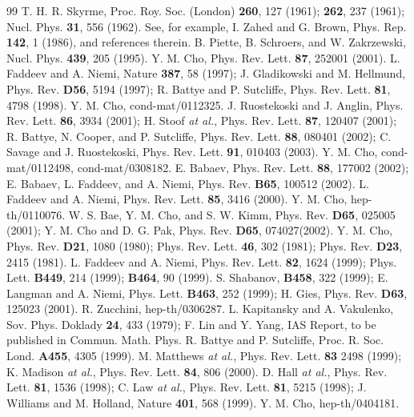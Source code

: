 \documentclass[twocolumn,showpacs,showkeys]{revtex4}
\begin{document}
\begin{thebibliography}{99}
T. H. R. Skyrme, Proc. Roy. Soc. (London) {\bf 260}, 127
(1961); {\bf 262}, 237 (1961); Nucl. Phys. {\bf 31}, 556 (1962).
 See, for example, I. Zahed and G. Brown,
Phys. Rep. {\bf 142}, 1 (1986), and references therein.
 B. Piette, B. Schroers, and W. Zakrzewski,
Nucl. Phys. {\bf 439}, 205 (1995).
 Y. M. Cho, Phys. Rev. Lett. {\bf 87}, 252001 (2001).
 L. Faddeev and A. Niemi, Nature {\bf 387}, 58 (1997);
J. Gladikowski and M. Hellmund, Phys. Rev. {\bf D56}, 5194 (1997);
R. Battye and P. Sutcliffe, Phys. Rev. Lett. {\bf 81}, 4798 (1998).
 Y. M. Cho, cond-mat/0112325.
 J. Ruostekoski and J. Anglin, Phys. Rev. Lett.
{\bf 86}, 3934 (2001); H. Stoof {\it at al.}, Phys. Rev. Lett. {\bf
87}, 120407 (2001); R. Battye, N. Cooper, and P. Sutcliffe,
Phys. Rev. Lett. {\bf 88}, 080401 (2002); C. Savage and
J. Ruostekoski, Phys. Rev. Lett. {\bf 91}, 010403 (2003).
 Y. M. Cho, cond-mat/0112498, cond-mat/0308182.
 E. Babaev, Phys. Rev. Lett. {\bf 88}, 177002 (2002);
E. Babaev, L. Faddeev, and A. Niemi, Phys. Rev. {\bf B65}, 100512 (2002).
 L. Faddeev and A. Niemi, Phys. Rev. Lett. {\bf 85},
3416 (2000).
 Y. M. Cho, hep-th/0110076.
 W. S. Bae, Y. M. Cho, and S. W. Kimm,
Phys. Rev. {\bf D65}, 025005 (2001);
Y. M. Cho and D. G. Pak, Phys. Rev. {\bf D65}, 074027(2002).
 Y. M. Cho, Phys. Rev. {\bf D21}, 1080 (1980);
Phys. Rev. Lett. {\bf 46}, 302 (1981);
Phys. Rev. {\bf D23}, 2415 (1981).
 L. Faddeev and A. Niemi, Phys. Rev. Lett.
{\bf 82}, 1624 (1999); Phys. Lett. {\bf B449}, 214 (1999);
{\bf B464}, 90 (1999).
 S. Shabanov, {\bf B458}, 322 (1999);
E. Langman and A. Niemi, Phys. Lett. {\bf B463}, 252 (1999);
H. Gies, Phys. Rev. {\bf D63}, 125023 (2001).
 R. Zucchini, hep-th/0306287.
L. Kapitansky and A. Vakulenko, Sov. Phys. Doklady
{\bf 24}, 433 (1979); F. Lin and Y. Yang, IAS Report, to be published
in Commun. Math. Phys.
 R. Battye and P. Sutcliffe, Proc. R. Soc.
Lond. {\bf A455}, 4305 (1999).
 M. Matthews {\it at al.}, Phys. Rev. Lett.
{\bf 83} 2498 (1999); K. Madison {\it at al.}, Phys. Rev. Lett.
{\bf 84}, 806 (2000).
 D. Hall {\it at al.}, Phys. Rev. Lett. {\bf 81},
1536 (1998); C. Law {\it at al.}, Phys. Rev. Lett. {\bf 81}, 5215 (1998);
J. Williams and M. Holland, Nature {\bf 401}, 568 (1999).
 Y. M. Cho, hep-th/0404181.
\end{thebibliography}
\end{document}

